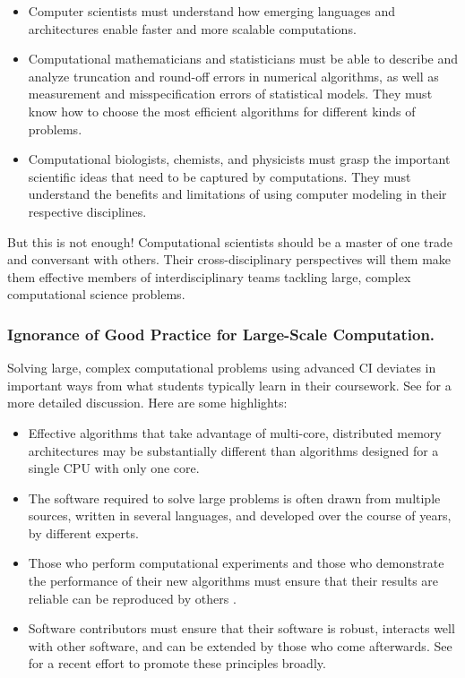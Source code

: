 \documentclass[11pt]{NSFamsart}
\begin{document}
\begin{itemize}
\item Computer scientists must understand how emerging languages and architectures enable faster and more scalable computations.  

\item Computational mathematicians and statisticians must be able to describe and analyze truncation and round-off errors in numerical algorithms, as well as measurement and misspecification errors of statistical models.  They must know how to choose the most efficient algorithms for different kinds of problems.

\item Computational biologists, chemists, and physicists must grasp the important scientific ideas that need to be captured by computations.  They must understand the benefits and limitations of using computer modeling in their respective disciplines.

\end{itemize}
But this is not enough!  Computational scientists should be a master of one trade and conversant with others.   Their cross-disciplinary perspectives will them make them effective members of interdisciplinary teams tackling large, complex computational science problems.

\subsubsection*{Ignorance of Good Practice for Large-Scale Computation.}  Solving large, complex computational problems using advanced CI deviates in important ways from what students typically learn in their coursework. See \cite[Sect.\ 2.4]{RudEtal18a} for a more detailed discussion.  Here are some highlights:

\begin{itemize}

\item Effective algorithms that take advantage of multi-core, distributed memory architectures may be substantially different than algorithms designed for a single CPU with only one core.

\item The software required to solve large problems is often drawn from multiple sources, written in several languages, and developed over the course of years, by different experts.

\item Those who perform computational experiments and those who demonstrate the performance of their new algorithms must ensure that their results are reliable can be reproduced by others \cite{Pen11}.  

\item Software contributors must ensure that their software is robust, interacts well with other software, and can be extended by those who come afterwards.  See \cite{BSS18} for a recent effort to promote these principles broadly.

\end{itemize}
\end{document}
